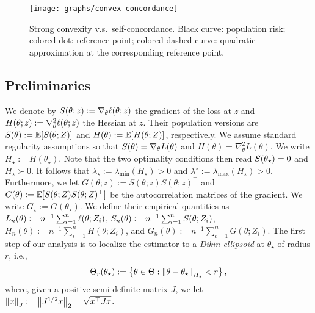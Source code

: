 \begin{figure}
    \centering
    \texttt{[image: graphs/convex-concordance]} %
    \caption{Strong convexity v.s.~self-concordance. Black curve: population risk; colored dot: reference point; colored dashed curve: quadratic approximation at the corresponding reference point.}
    \label{fig:convex_concordance}
\end{figure}

\subsection{Preliminaries}
\label{sub:preliminary}

We denote by $S(\theta; z) := \nabla_\theta \ell(\theta; z)$ the gradient of the loss at $z$ and $H(\theta; z) := \nabla_\theta^2 \ell(\theta; z)$ the Hessian at $z$.
Their population versions are $S(\theta) := \operatorname{\mathbb E}[S(\theta; Z)]$ and $H(\theta) := \operatorname{\mathbb E}[H(\theta; Z)]$, respectively.
We assume standard regularity assumptions so that $S(\theta) = \nabla_\theta L(\theta)$ and $H(\theta) = \nabla_\theta^2 L(\theta)$.
We write $H_\star := H(\theta_\star)$.
Note that the two optimality conditions then read $S(\theta_\star) = 0$ and $H_\star \succ 0$.
It follows that $\lambda_\star := \lambda_{\min}(H_\star) > 0$ and $\lambda^\star := \lambda_{\max}(H_\star) > 0$.
Furthermore, we let $G(\theta; z) := S(\theta; z) S(\theta; z)^\top$ and $G(\theta) := \operatorname{\mathbb E}[S(\theta; Z)S(\theta; Z)^\top]$ be the autocorrelation matrices of the gradient.
We write $G_\star := G(\theta_\star)$.
We define their empirical quantities as $L_n(\theta) := n^{-1} \sum_{i=1}^n \ell(\theta; Z_i)$, $S_n(\theta) := n^{-1} \sum_{i=1}^n S(\theta; Z_i)$, $H_n(\theta) := n^{-1} \sum_{i=1}^n H(\theta; Z_i)$, and $G_n(\theta) := n^{-1} \sum_{i=1}^n G(\theta; Z_i)$.
The first step of our analysis is to localize the estimator to a \emph{Dikin ellipsoid} at $\theta_\star$ of radius $r$, i.e.,
\begin{align*}
    \Theta_r(\theta_\star) := \left\{\theta \in \Theta: \left\lVert \theta - \theta_\star \right\rVert_{H_\star} < r \right\},
\end{align*}
where, given a positive semi-definite matrix $J$, we let $\left\lVert x \right\rVert_J := \left\lVert J^{1/2} x \right\rVert_2 = \sqrt{x^\top J x}$.


